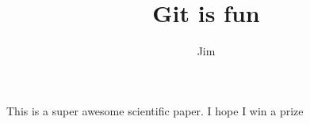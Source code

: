 \documentclass[10pt]{article}
\author{Jim}
\title{Git is fun}
\begin{document}
    \maketitle

    This is a super awesome scientific paper.
    I hope I win a prize
\end{document}
